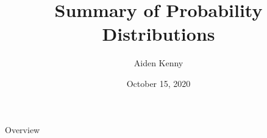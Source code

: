 \documentclass[8pt, handout]{beamer}
\title{Summary of Probability Distributions}
\author{Aiden Kenny}
\institute{STAT GR5203: Probability}
\date{October 15, 2020}
\begin{document}
\begin{frame}{}

    \maketitle

\end{frame}

\begin{frame}{Overview}

    

\end{frame}
\end{document}

